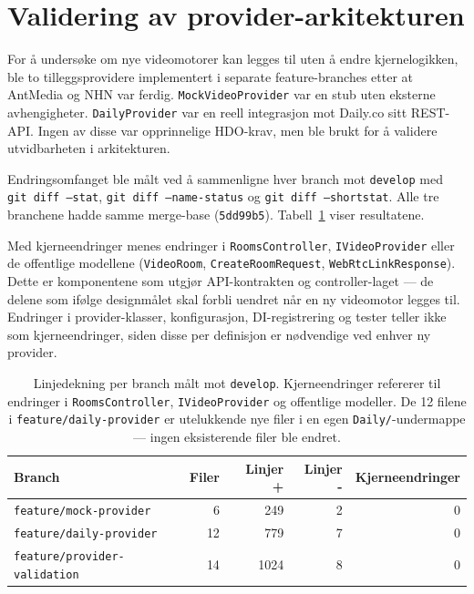 \section{Validering av provider-arkitekturen}
\label{sec:provider-validering}
For å undersøke om nye videomotorer kan legges til uten å endre
kjernelogikken, ble to tilleggsprovidere implementert i separate
feature-branches etter at AntMedia og NHN var ferdig.
\texttt{MockVideoProvider} var en stub uten eksterne avhengigheter.
\texttt{DailyProvider} var en reell integrasjon mot Daily.co sitt
REST-API. Ingen av disse var opprinnelige HDO-krav, men ble brukt
for å validere utvidbarheten i arkitekturen.

Endringsomfanget ble målt ved å sammenligne hver branch mot
\texttt{develop} med \texttt{git diff --stat},
\texttt{git diff --name-status} og \texttt{git diff --shortstat}.
Alle tre branchene hadde samme merge-base (\texttt{5dd99b5}).
Tabell~\ref{tab:provider-validering} viser resultatene.

Med kjerneendringer menes endringer i \texttt{RoomsController},
\texttt{IVideoProvider} eller de offentlige modellene
(\texttt{VideoRoom}, \texttt{CreateRoomRequest},
\texttt{WebRtcLinkResponse}). Dette er komponentene som utgjør
API-kontrakten og controller-laget — de delene som ifølge
designmålet skal forbli uendret når en ny videomotor legges til.
Endringer i provider-klasser, konfigurasjon, DI-registrering og
tester teller ikke som kjerneendringer, siden disse per definisjon
er nødvendige ved enhver ny provider.

\begin{table}[h]
\centering
\begin{tabular}{lrrrr}
\toprule
\textbf{Branch} & \textbf{Filer} & \textbf{Linjer +} &
\textbf{Linjer -} & \textbf{Kjerneendringer} \\
\midrule
\texttt{feature/mock-provider}       & 6  & 249  & 2 & 0 \\
\texttt{feature/daily-provider}      & 12 & 779  & 7 & 0 \\
\texttt{feature/provider-validation} & 14 & 1024 & 8 & 0 \\
\bottomrule
\end{tabular}
\caption{Linjedekning per branch målt mot \texttt{develop}.
Kjerneendringer refererer til endringer i \texttt{RoomsController},
\texttt{IVideoProvider} og offentlige modeller. De 12 filene i
\texttt{feature/daily-provider} er utelukkende nye filer i en egen
\texttt{Daily/}-undermappe — ingen eksisterende filer ble endret.}
\label{tab:provider-validering}
\end{table}

